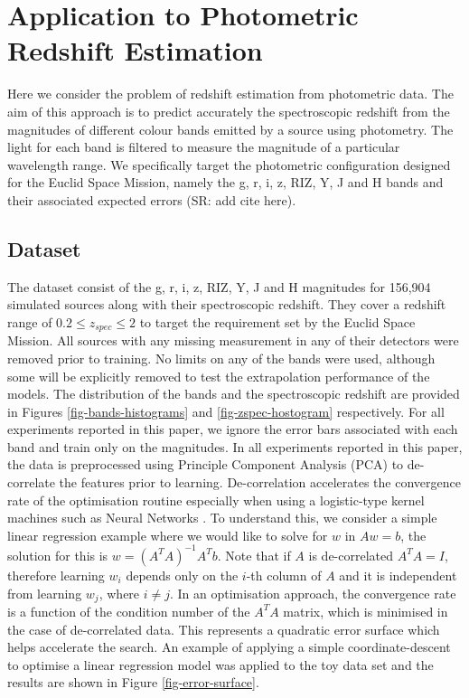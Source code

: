 \documentclass[useAMS,usenatbib,fleqn]{mn2e}
\begin{document}
\section{Application to Photometric Redshift Estimation}
\label{sec-application}

Here we consider the problem of redshift estimation from photometric data. The aim of this approach is to predict accurately the spectroscopic redshift from the magnitudes of different colour bands emitted by a source using photometry. The light for each band is filtered to measure the magnitude of a particular wavelength range. We specifically target the photometric configuration designed for the Euclid Space Mission, namely the g, r, i, z, RIZ, Y, J and H bands and their associated expected errors (SR: add cite here).

\subsection{Dataset}
\label{sec-dataset}

The dataset consist of the g, r, i, z, RIZ, Y, J and H magnitudes for 156,904 simulated sources along with their spectroscopic redshift. They cover a redshift range of $0.2 \le z_{spec} \le 2$ to target the requirement set by the Euclid Space Mission. All sources with any missing measurement in any of their detectors were removed prior to training. No limits on any of the bands were used, although some will be explicitly removed to test the extrapolation performance of the models. The distribution of the bands and the spectroscopic redshift are provided in Figures \ref{fig-bands-histograms} and \ref{fig-zspec-hostogram} respectively. For all experiments reported in this paper, we ignore the error bars associated with each band and train only on the magnitudes. In all experiments reported in this paper, the data is preprocessed using Principle Component Analysis (PCA) \citep{jolliffe1986} to de-correlate the features prior to learning. De-correlation accelerates the convergence rate of the optimisation routine especially when using a logistic-type kernel machines such as Neural Networks \citep{lecun1998}. To understand this, we consider a simple linear regression example where we would like to solve for $w$ in $Aw=b$, the solution for this is $w=\left(A^{T}A\right)^{-1}A^{T}b$. Note that if $A$ is de-correlated $A^{T}A=I$, therefore learning $w_{i}$ depends only on the $i$-th column of $A$ and it is independent from learning $w_{j}$, where $i\ne j$. In an optimisation approach, the convergence rate is a function of the condition number of the $A^{T}A$ matrix, which is minimised in the case of de-correlated data. This represents a quadratic error surface which helps accelerate the search. An example of applying a simple coordinate-descent to optimise a linear regression model was applied to the toy data set and the results are shown in Figure \ref{fig-error-surface}.
\end{document}
